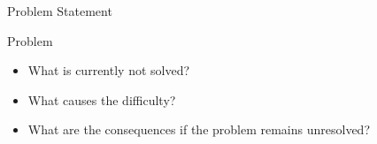 \begin{frame}{Problem Statement}

\begin{block}{Problem}
\end{block}

\vspace{0.45cm}

\begin{itemize}
    \item What is currently not solved?
    \item What causes the difficulty?
    \item What are the consequences if the problem remains unresolved?
\end{itemize}

\end{frame}
